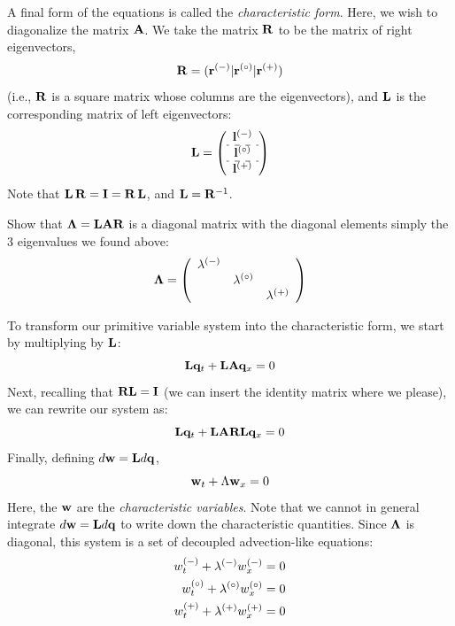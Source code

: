 A final form of the equations is called the {\em characteristic form}.  Here,
we wish to diagonalize the matrix ${\bf A}$.  We take the matrix ${\bf R}$ to be the
matrix of right eigenvectors,
\begin{equation}
{\bf R} = ({\bf r}^{(-)} | {\bf r}^{(\circ)} | {\bf r}^{(+)} )
\end{equation}
(i.e., ${\bf R}$ is a square matrix whose columns are the eigenvectors),
and ${\bf L}$
is the corresponding matrix of left eigenvectors:
\begin{equation}
\Lb = \left ( \begin{array}{c} \lb^\evm \\
                             \hdashline
                             \lb^\evz \\
                             \hdashline
                             \lb^\evp \end{array} \right )
\end{equation}
Note that ${\bf L}\, {\bf R} = {\bf I} = {\bf R}\, {\bf L}$, and ${\bf L} = {\bf R}^{-1}$.
\begin{exercise}
{
Show that ${\boldsymbol{\Lambda}} = {\bf L} {\bf A} {\bf R}$ is a diagonal matrix with the diagonal elements
simply the 3 eigenvalues we found above:
\begin{equation}
{\boldsymbol{\Lambda}} =
   \left ( \begin{array}{ccc}
             \lambda^{(-)} &              & \\
                          & \lambda^{(\circ)} & \\
                          &              & \lambda^{(+)} \end{array} \right )
\end{equation}
}
\end{exercise}
To transform our primitive variable system into the characteristic form, we 
start by multiplying by ${\bf L}$:
\begin{equation}
{\bf L}{\bf q}_t + {\bf L} {\bf A} {\bf q}_x = 0
\end{equation}
Next, recalling that ${\bf R}{\bf L} = {\bf I}$ (we can insert
the identity matrix where we please), we can rewrite our system as:
\begin{equation}
{\bf L}{\bf q}_t + {\bf L} {\bf A} {\bf R} {\bf L} {\bf q}_x = 0
\end{equation}
Finally, defining $d{\bf w} = {\bf L} d{\bf q}$,
\begin{equation}
{\bf w}_t + \Lambda {\bf w}_x = 0
\end{equation}
Here, the ${\bf w}$ are the {\em characteristic variables}.  Note that we cannot
in general integrate $d{\bf w} = {\bf L} d{\bf q}$ to write down the characteristic
quantities.  Since ${\boldsymbol{\Lambda}}$ is diagonal, this system is a set of
decoupled advection-like equations:
\begin{align}
w_t^{(-)} + \lambda^{(-)} w_x^{(-)} &= 0 \\
w_t^{(\circ)} + \lambda^{(\circ)} w_x^{(\circ)} &= 0 \\
w_t^{(+)} + \lambda^{(+)} w_x^{(+)} &= 0 
\end{align}

